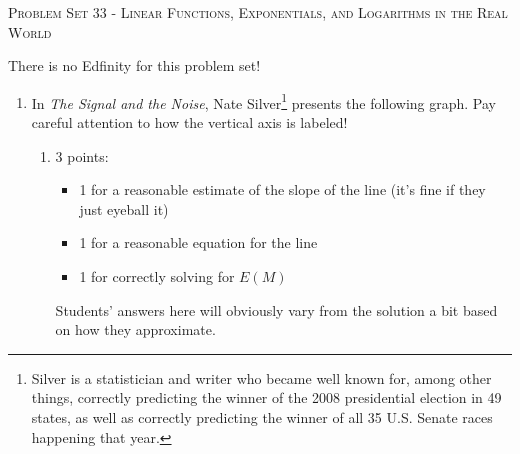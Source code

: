 \documentclass{article}
\begin{document}
\begin{center}
  \large\textsc{Problem Set 33 - Linear Functions, Exponentials, and Logarithms in the Real World}
\end{center}

There is no Edfinity for this problem set!

\begin{enumerate}
\item \label{earthquake-frequency}

  In \emph{The Signal and the Noise}, Nate Silver\footnote{Silver is a statistician and writer who became well known for, among other things, correctly predicting the winner of the 2008 presidential election in 49 states, as well as correctly predicting the winner of all 35 U.S. Senate races happening that year.} presents the following graph. Pay careful attention to how the vertical axis is labeled!


  \begin{enumerate}

  \item \label{earthquake-frequency-model}

    \begin{grading}
      3 points:
      \begin{itemize}[nosep]
      \item 1 for a reasonable estimate of the slope of the line (it's fine if they just eyeball it)
      \item 1 for a reasonable equation for the line
      \item 1 for correctly solving for $E(M)$
      \end{itemize}
      Students' answers here will obviously vary from the solution a bit based on how they approximate.
    \end{grading}


\end{enumerate}
\end{enumerate}
\end{document}
